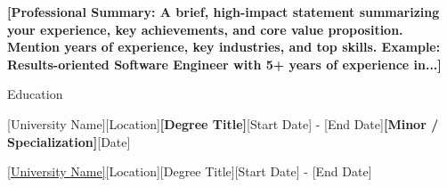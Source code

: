 \documentclass{resume} %
\begin{document}
\textbf{[Professional Summary: A brief, high-impact statement summarizing your experience, key achievements, and core value proposition. Mention years of experience, key industries, and top skills. Example: Results-oriented Software Engineer with 5+ years of experience in...]}


\begin{rSection}{Education \vspace{.2em}}
\begin{rSubsection}{[University Name]}{[Location]}{\textbf{[Degree Title]}}{[Start Date] - [End Date]}{\textbf{[Minor / Specialization]}}\hfill{[Date]}
\end{rSubsection}

\begin{rSubsection}{\href{[University URL]}{[University Name]}}{[Location]}{[Degree Title]}{[Start Date] - [End Date]}

\end{rSubsection}
\vspace{0.2 em}
\end{rSection}

\end{document}
